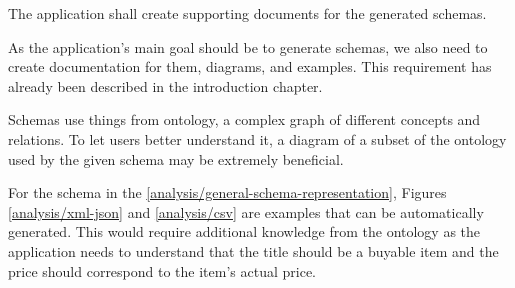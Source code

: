 \begin{requirement}
    The application shall create supporting documents for the generated schemas.
\end{requirement}

As the application's main goal should be to generate schemas, we also need to create documentation for them, diagrams, and examples. This requirement has already been described in the introduction chapter.

Schemas use things from ontology, a complex graph of different concepts and relations. To let users better understand it, a diagram of a subset of the ontology used by the given schema may be extremely beneficial. %

For the schema in the \autoref{analysis/general-schema-representation}, Figures \ref{analysis/xml-json} and \ref{analysis/csv} are examples that can be automatically generated. This would require additional knowledge from the ontology as the application needs to understand that the title should be a buyable item and the price should correspond to the item's actual price. %